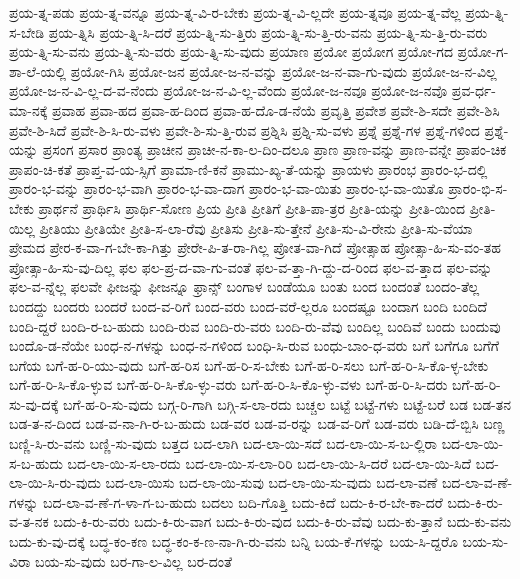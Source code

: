 {ಪ್ರಯ-ತ್ನ-ಪಡು
ಪ್ರಯ-ತ್ನ-ವನ್ನೂ
ಪ್ರಯ-ತ್ನ-ವಿ-ರ-ಬೇಕು
ಪ್ರಯ-ತ್ನ-ವಿ-ಲ್ಲದೇ
ಪ್ರಯ-ತ್ನವೂ
ಪ್ರಯ-ತ್ನ-ವೆಲ್ಲ
ಪ್ರಯ-ತ್ನಿ-ಸ-ಬೇಡಿ
ಪ್ರಯ-ತ್ನಿಸಿ
ಪ್ರಯ-ತ್ನಿ-ಸಿ-ದರೆ
ಪ್ರಯ-ತ್ನಿ-ಸು-ತ್ತಿರು
ಪ್ರಯ-ತ್ನಿ-ಸು-ತ್ತಿ-ರು-ವನು
ಪ್ರಯ-ತ್ನಿ-ಸು-ತ್ತಿ-ರು-ವರು
ಪ್ರಯ-ತ್ನಿ-ಸು-ವನು
ಪ್ರಯ-ತ್ನಿ-ಸು-ವರು
ಪ್ರಯ-ತ್ನಿ-ಸು-ವುದು
ಪ್ರಯಾಣ
ಪ್ರಯೋ
ಪ್ರಯೋಗ
ಪ್ರಯೋ-ಗದ
ಪ್ರಯೋ-ಗ-ಶಾ-ಲೆ-ಯಲ್ಲಿ
ಪ್ರಯೋ-ಗಿಸಿ
ಪ್ರಯೋ-ಜನ
ಪ್ರಯೋ-ಜ-ನ-ವನ್ನು
ಪ್ರಯೋ-ಜ-ನ-ವಾ-ಗು-ವುದು
ಪ್ರಯೋ-ಜ-ನ-ವಿಲ್ಲ
ಪ್ರಯೋ-ಜ-ನ-ವಿ-ಲ್ಲ-ದ-ವ-ನೆಂದು
ಪ್ರಯೋ-ಜ-ನ-ವಿ-ಲ್ಲ-ವೆಂದು
ಪ್ರಯೋ-ಜ-ನವೂ
ಪ್ರಯೋ-ಜ-ನವೊ
ಪ್ರವ-ರ್ಧ-ಮಾ-ನಕ್ಕೆ
ಪ್ರವಾಹ
ಪ್ರವಾ-ಹದ
ಪ್ರವಾ-ಹ-ದಿಂದ
ಪ್ರವಾ-ಹ-ದೊ-ಡ-ನೆಯೆ
ಪ್ರವೃತ್ತಿ
ಪ್ರವೇಶ
ಪ್ರವೇ-ಶಿ-ಸದೇ
ಪ್ರವೇ-ಶಿಸಿ
ಪ್ರವೇ-ಶಿ-ಸಿದೆ
ಪ್ರವೇ-ಶಿ-ಸಿ-ರು-ವಳು
ಪ್ರವೇ-ಶಿ-ಸು-ತ್ತಿ-ರುವ
ಪ್ರಶ್ನಿಸಿ
ಪ್ರಶ್ನಿ-ಸು-ವಳು
ಪ್ರಶ್ನೆ
ಪ್ರಶ್ನೆ-ಗಳ
ಪ್ರಶ್ನೆ-ಗಳಿಂದ
ಪ್ರಶ್ನೆ-ಯನ್ನು
ಪ್ರಸಂಗ
ಪ್ರಸಾರ
ಪ್ರಾಂತ್ಯ
ಪ್ರಾಚೀನ
ಪ್ರಾಚೀ-ನ-ಕಾ-ಲ-ದಿಂ-ದಲೂ
ಪ್ರಾಣ
ಪ್ರಾಣ-ವನ್ನು
ಪ್ರಾಣ-ವನ್ನೇ
ಪ್ರಾಪಂ-ಚಿಕ
ಪ್ರಾಪಂ-ಚಿ-ಕತೆ
ಪ್ರಾಪ್ತ-ವ-ಯ-ಸ್ಸಿಗೆ
ಪ್ರಾಮಾ-ಣಿ-ಕನೆ
ಪ್ರಾಮು-ಖ್ಯ-ತೆ-ಯನ್ನು
ಪ್ರಾಯಳು
ಪ್ರಾರಂಭ
ಪ್ರಾರಂ-ಭ-ದಲ್ಲಿ
ಪ್ರಾರಂ-ಭ-ವನ್ನು
ಪ್ರಾರಂ-ಭ-ವಾಗಿ
ಪ್ರಾರಂ-ಭ-ವಾ-ದಾಗ
ಪ್ರಾರಂ-ಭ-ವಾ-ಯಿತು
ಪ್ರಾರಂ-ಭ-ವಾ-ಯಿತೊ
ಪ್ರಾರಂ-ಭಿ-ಸ-ಬೇಕು
ಪ್ರಾರ್ಥನೆ
ಪ್ರಾರ್ಥಿಸಿ
ಪ್ರಾರ್ಥಿ-ಸೋಣ
ಪ್ರಿಯ
ಪ್ರೀತಿ
ಪ್ರೀತಿಗೆ
ಪ್ರೀತಿ-ಪಾ-ತ್ರರ
ಪ್ರೀತಿ-ಯನ್ನು
ಪ್ರೀತಿ-ಯಿಂದ
ಪ್ರೀತಿ-ಯಿಲ್ಲ
ಪ್ರೀತಿಯು
ಪ್ರೀತಿಯೇ
ಪ್ರೀತಿ-ಸ-ಲಾ-ರೆವು
ಪ್ರೀತಿಸು
ಪ್ರೀತಿ-ಸು-ತ್ತೇನೆ
ಪ್ರೀತಿ-ಸು-ವಿ-ರೇನು
ಪ್ರೀತಿ-ಸು-ವೆಯಾ
ಪ್ರೇಮದ
ಪ್ರೇರ-ಕ-ವಾ-ಗ-ಬೇ-ಕಾ-ಗಿತ್ತು
ಪ್ರೇರೇ-ಪಿ-ತ-ರಾ-ಗಿಲ್ಲ
ಪ್ರೋತ-ವಾ-ಗಿದೆ
ಪ್ರೋತ್ಸಾಹ
ಪ್ರೋತ್ಸಾ-ಹಿ-ಸು-ವಂ-ತಹ
ಪ್ರೋತ್ಸಾ-ಹಿ-ಸು-ವು-ದಿಲ್ಲ
ಫಲ
ಫಲ-ಪ್ರ-ದ-ವಾ-ಗು-ವಂತೆ
ಫಲ-ವ-ತ್ತಾ-ಗಿ-ದ್ದು-ದ-ರಿಂದ
ಫಲ-ವ-ತ್ತಾದ
ಫಲ-ವನ್ನು
ಫಲ-ವ-ನ್ನೆಲ್ಲ
ಫಲವೇ
ಫೀಜನ್ನು
ಫೀಜನ್ನೂ
ಫ್ರಾನ್ಸ್
ಬಂಗಾಳ
ಬಂಡೆಯೂ
ಬಂತು
ಬಂದ
ಬಂದಂತೆ
ಬಂದಂ-ತೆಲ್ಲ
ಬಂದದ್ದು
ಬಂದರು
ಬಂದರೆ
ಬಂದ-ವ-ರಿಗೆ
ಬಂದ-ವರು
ಬಂದ-ವರೆ-ಲ್ಲರೂ
ಬಂದಷ್ಟೂ
ಬಂದಾಗ
ಬಂದಿ
ಬಂದಿದೆ
ಬಂದಿ-ದ್ದರೆ
ಬಂದಿ-ರ-ಬ-ಹುದು
ಬಂದಿ-ರುವ
ಬಂದಿ-ರು-ವರು
ಬಂದಿ-ರು-ವೆವು
ಬಂದಿಲ್ಲ
ಬಂದಿವೆ
ಬಂದು
ಬಂದುವು
ಬಂದೊ-ಡ-ನೆಯೇ
ಬಂಧ-ನ-ಗಳನ್ನು
ಬಂಧ-ನ-ಗಳಿಂದ
ಬಂಧಿ-ಸಿ-ರುವ
ಬಂಧು-ಬಾಂ-ಧ-ವರು
ಬಗೆ
ಬಗೆಗೂ
ಬಗೆಗೆ
ಬಗೆಯ
ಬಗೆ-ಹ-ರಿ-ಯು-ವುದು
ಬಗೆ-ಹ-ರಿಸ
ಬಗೆ-ಹ-ರಿ-ಸ-ಬೇಕು
ಬಗೆ-ಹ-ರಿ-ಸಲು
ಬಗೆ-ಹ-ರಿ-ಸಿ-ಕೊ-ಳ್ಳ-ಬೇಕು
ಬಗೆ-ಹ-ರಿ-ಸಿ-ಕೊ-ಳ್ಳುವ
ಬಗೆ-ಹ-ರಿ-ಸಿ-ಕೊ-ಳ್ಳು-ವರು
ಬಗೆ-ಹ-ರಿ-ಸಿ-ಕೊ-ಳ್ಳು-ವಳು
ಬಗೆ-ಹ-ರಿ-ಸಿ-ದರು
ಬಗೆ-ಹ-ರಿ-ಸು-ವು-ದಕ್ಕೆ
ಬಗೆ-ಹ-ರಿ-ಸು-ವುದು
ಬಗ್ಗ-ರಿ-ಗಾಗಿ
ಬಗ್ಗಿ-ಸ-ಲಾ-ರದು
ಬಚ್ಚಲ
ಬಟ್ಟೆ
ಬಟ್ಟೆ-ಗಳು
ಬಟ್ಟೆ-ಬರೆ
ಬಡ
ಬಡ-ತನ
ಬಡ-ತ-ನ-ದಿಂದ
ಬಡ-ವ-ನಾ-ಗಿ-ರ-ಬ-ಹುದು
ಬಡ-ವರ
ಬಡ-ವ-ರನ್ನು
ಬಡ-ವ-ರಿಗೆ
ಬಡ-ವರು
ಬಡಿ-ದೆ-ಬ್ಬಿಸಿ
ಬಣ್ಣ
ಬಣ್ಣಿ-ಸಿ-ರು-ವನು
ಬಣ್ಣಿ-ಸು-ವುದು
ಬತ್ತದ
ಬದ-ಲಾಗಿ
ಬದ-ಲಾ-ಯಿ-ಸದೆ
ಬದ-ಲಾ-ಯಿ-ಸ-ಬ-ಲ್ಲಿರಾ
ಬದ-ಲಾ-ಯಿ-ಸ-ಬ-ಹುದು
ಬದ-ಲಾ-ಯಿ-ಸ-ಲಾ-ರದು
ಬದ-ಲಾ-ಯಿ-ಸ-ಲಾ-ರಿರಿ
ಬದ-ಲಾ-ಯಿ-ಸಿ-ದರೆ
ಬದ-ಲಾ-ಯಿ-ಸಿದೆ
ಬದ-ಲಾ-ಯಿ-ಸಿ-ರು-ವುದು
ಬದ-ಲಾ-ಯಿಸು
ಬದ-ಲಾ-ಯಿ-ಸುವು
ಬದ-ಲಾ-ಯಿ-ಸು-ವುದು
ಬದ-ಲಾ-ವಣೆ
ಬದ-ಲಾ-ವ-ಣೆ-ಗಳನ್ನು
ಬದ-ಲಾ-ವ-ಣೆ-ಗ-ಳಾ-ಗ-ಬ-ಹುದು
ಬದಲು
ಬದಿ-ಗೊತ್ತಿ
ಬದು-ಕಿದೆ
ಬದು-ಕಿ-ರ-ಬೇ-ಕಾ-ದರೆ
ಬದು-ಕಿ-ರು-ವ-ತ-ನಕ
ಬದು-ಕಿ-ರು-ವರು
ಬದು-ಕಿ-ರು-ವಾಗ
ಬದು-ಕಿ-ರು-ವುದ
ಬದು-ಕಿ-ರು-ವೆವು
ಬದು-ಕು-ತ್ತಾನೆ
ಬದು-ಕು-ವನು
ಬದು-ಕು-ವು-ದಕ್ಕೆ
ಬದ್ಧ-ಕಂ-ಕಣ
ಬದ್ಧ-ಕಂ-ಕ-ಣ-ನಾ-ಗಿ-ರು-ವನು
ಬನ್ನಿ
ಬಯ-ಕೆ-ಗಳನ್ನು
ಬಯ-ಸಿ-ದ್ದರೊ
ಬಯ-ಸು-ವಿರಾ
ಬಯ-ಸು-ವುದು
ಬರ-ಗಾ-ಲ-ವಿಲ್ಲ
ಬರ-ದಂತೆ
}
